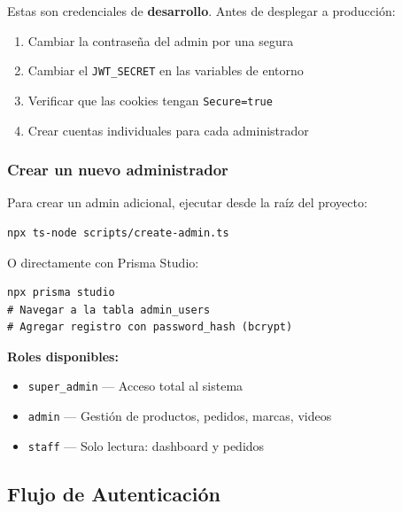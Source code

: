\documentclass[12pt, a4paper]{article}
\begin{document}
\begin{warnbox}
Estas son credenciales de \textbf{desarrollo}. Antes de desplegar a producci\'{o}n:
\begin{enumerate}[nosep]
    \item Cambiar la contrase\~{n}a del admin por una segura
    \item Cambiar el \texttt{JWT\_SECRET} en las variables de entorno
    \item Verificar que las cookies tengan \texttt{Secure=true}
    \item Crear cuentas individuales para cada administrador
\end{enumerate}
\end{warnbox}

\subsubsection{Crear un nuevo administrador}

Para crear un admin adicional, ejecutar desde la ra\'{i}z del proyecto:

\begin{lstlisting}[style=mexcode]
npx ts-node scripts/create-admin.ts
\end{lstlisting}

O directamente con Prisma Studio:

\begin{lstlisting}[style=mexcode]
npx prisma studio
# Navegar a la tabla admin_users
# Agregar registro con password_hash (bcrypt)
\end{lstlisting}

\textbf{Roles disponibles:}
\begin{itemize}[nosep]
    \item \texttt{super\_admin} --- Acceso total al sistema
    \item \texttt{admin} --- Gesti\'{o}n de productos, pedidos, marcas, videos
    \item \texttt{staff} --- Solo lectura: dashboard y pedidos
\end{itemize}

\subsection{Flujo de Autenticaci\'{o}n}
\end{document}
